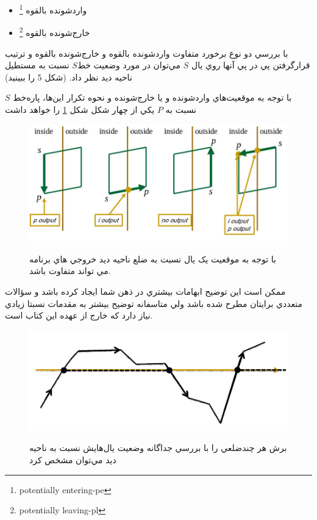 \documentclass{book}
\begin{document}
\begin{itemize}
    \item
    وارد‌شونده بالقوه \footnote{potentially entering-pe}
    \item
    خارج‌شونده بالقوه \footnote{potentially leaving-pl}
\end{itemize}

با بررسي دو نوع برخورد متفاوت وارد‌شونده بالقوه و خارج‌شونده بالقوه و ترتيب قرارگرفتن پي در پي آنها روي يال $S$ مي‌توان در مورد وضعيت خط$S$  نسبت به مستطيل ناحيه ديد نظر داد. (شکل 5 را ببينيد) 

با توجه به موقعيت‌هاي  واردشونده و يا خارج‌شونده و نحوه تکرار اين‌ها، پاره‌خط $S$ نسبت به $P$ يکي از چهار شکل شکل \ref{in_out} را خواهد داشت

\begin{figure}[h!]
    \begin{center}
        \includegraphics[width=\linewidth]{in_out.jpg}
        \label{in_out}
        \caption{ با توجه به موقعيت يک يال نسبت به ضلع ناحيه ديد خروجي هاي برنامه مي تواند متفاوت باشد.}
    \end{center}
\end{figure}

ممکن است اين توضيح ابهامات بيشتري در ذهن شما ايجاد کرده باشد و سؤالات متعددي برايتان مطرح شده باشد ولي متاسفانه توضيح بيشتر به مقدمات نسبتا زيادي نياز دارد که خارج از عهده اين کتاب است.

\begin{figure}[h!]
    \begin{center}
        \includegraphics[width=\linewidth]{p_clip.png}
        \label{p_clip}
        \caption{ برش هر چندضلعي را با بررسي جداگانه وضعيت يال‌هايش نسبت به ناحيه ديد مي‌توان  مشخص کرد}
    \end{center}
\end{figure}
\end{document}
